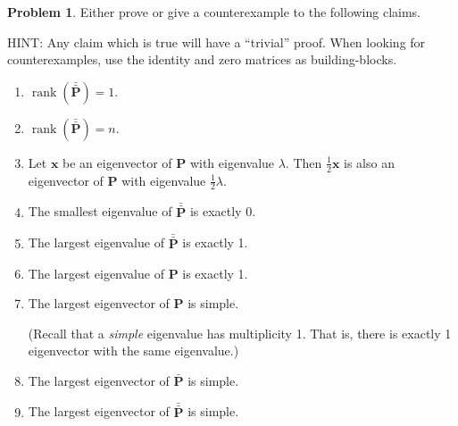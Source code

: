 \documentclass[10pt]{article}
\theoremstyle{definition}
\newtheorem{problem}{Problem}
\DeclareMathOperator{\rank}{rank}
\newcommand{\p}{\mathbf P}
\newcommand{\pb}{\bar {\p}}
\newcommand{\pbb}{\bar {\pb}}
\newcommand{\trans}[1]{{#1}^{T}}
\newcommand{\x}{\mathbf x}
\begin{document}
\begin{problem}
    Either prove or give a counterexample to the following claims.

    HINT:
    Any claim which is true will have a ``trivial'' proof.
    When looking for counterexamples, use the identity and zero matrices as building-blocks.
    \begin{enumerate}
        \item
            $\rank(\pbb) = 1$.
            \vspace{4.5in}
        \item
            $\rank(\pbb) = n$.
            \vspace{4.5in}

        \item
            Let $\x$ be an eigenvector of $\p$ with eigenvalue $\lambda$.
            Then $\frac 1 2 \x$ is also an eigenvector of $\p$ with eigenvalue $\frac 1 2 \lambda$.
            \vspace{4.5in}

        \item
            The smallest eigenvalue of $\pbb$ is exactly 0.
            \vspace{4.5in}
        \item
            The largest eigenvalue of $\pbb$ is exactly 1.
            \vspace{4.5in}
        \item
            The largest eigenvalue of $\p$ is exactly 1.
            \vspace{4.5in}

        \item
            The largest eigenvector of $\p$ is simple.

            (Recall that a \emph{simple} eigenvalue has multiplicity 1.
            That is, there is exactly 1 eigenvector with the same eigenvalue.)
            \vspace{4.5in}

        \item
            The largest eigenvector of $\pb$ is simple.
            \vspace{4.5in}

        \item
            The largest eigenvector of $\pbb$ is simple.
            \vspace{4.5in}

%
%
    \end{enumerate}
\end{problem}
\end{document}
